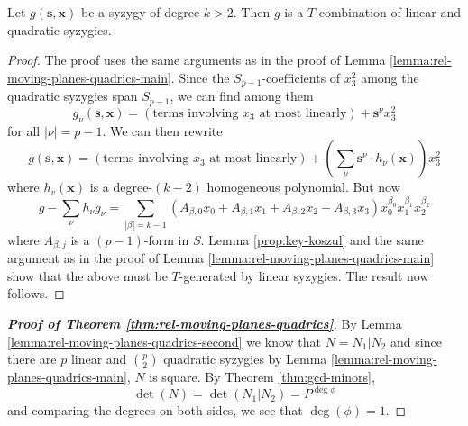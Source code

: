 \documentclass[fleqn,reqno]{amsart}
\numberwithin{first}{chapter}
\numberwithin{section}{chapter}
\numberwithin{equation}{first}
\begin{document}
\begin{lemma}
	\label{lemma:rel-moving-planes-quadrics-second}
	Let $g(\mathbf s, \mathbf x)$ be a syzygy of degree $k>2$.
	Then $g$ is a $T$-combination of linear and quadratic syzygies.
\end{lemma}

\begin{proof}
	The proof uses the same arguments as in the proof of Lemma \ref{lemma:rel-moving-planes-quadrics-main}.
	Since the $S_{p-1}$-coefficients of $x_3^2$ among the quadratic syzygies span $S_{p-1}$,
	we can find among them
	\[
		g_\nu(\mathbf s,\mathbf x)=(\text{terms involving $x_3$ at most linearly})+{\mathbf s}^\nu x_3^2
	\]
	for all $|\nu|=p-1$. We can then rewrite
	\[
		g(\mathbf s,\mathbf x)=(\text{terms involving $x_3$ at most linearly})+(\sum_\nu {\mathbf s}^\nu\cdot h_\nu(\mathbf x))x_3^2
	\]
	where $h_v(\mathbf x)$ is a degree-$(k-2)$ homogeneous polynomial. But now
	\[
		g-\sum_\nu h_\nu g_\nu=\sum_{|\beta|=k-1} (A_{\beta,0}x_0+A_{\beta,1}x_1+A_{\beta,2}x_2+A_{\beta,3}x_3) x_0^{\beta_0}x_1^{\beta_1}x_2^{\beta_2}
	\]
	where $A_{\beta,j}$ is a $(p-1)$-form in $S$.
	Lemma \ref{prop:key-koszul} and the same argument as in the proof of Lemma \ref{lemma:rel-moving-planes-quadrics-main}
	show that the above must be $T$-generated by linear syzygies.
	The result now follows.
\end{proof}

\begin{proof}[\bf Proof of Theorem \ref{thm:rel-moving-planes-quadrics}]
	By Lemma \ref{lemma:rel-moving-planes-quadrics-second} we know that $N=N_1|N_2$
	and since there are $p$ linear and $\binom{p}{2}$ quadratic syzygies
	by Lemma \ref{lemma:rel-moving-planes-quadrics-main}, $N$ is square.
	By Theorem \ref{thm:gcd-minors},
	\[
		\det(N)=\det(N_1|N_2)=P^{\deg\phi}
	\]
	and comparing the degrees on both sides, we see that $\deg(\phi)=1$.
\end{proof}


\end{document}
